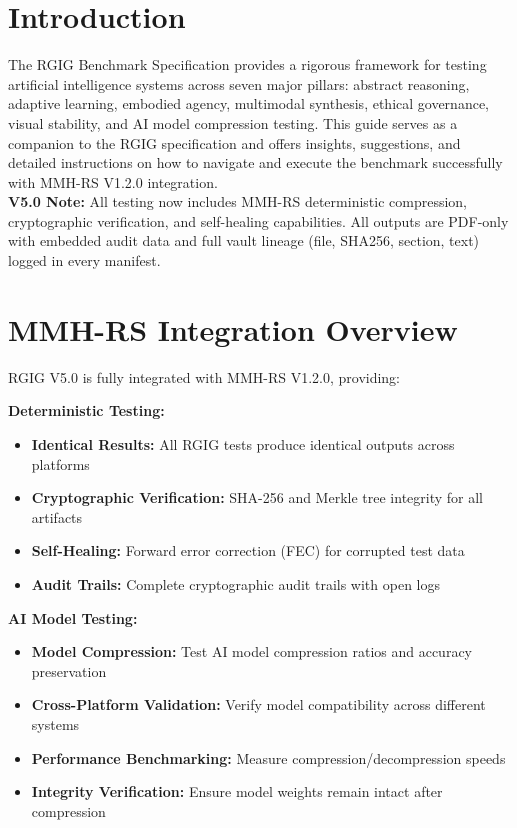 
\section*{Introduction}
The RGIG Benchmark Specification provides a rigorous framework for testing artificial intelligence systems across seven major pillars: abstract reasoning, adaptive learning, embodied agency, multimodal synthesis, ethical governance, visual stability, and AI model compression testing. This guide serves as a companion to the RGIG specification and offers insights, suggestions, and detailed instructions on how to navigate and execute the benchmark successfully with MMH-RS V1.2.0 integration.\\
\textbf{V5.0 Note:} All testing now includes MMH-RS deterministic compression, cryptographic verification, and self-healing capabilities. All outputs are PDF-only with embedded audit data and full vault lineage (file, SHA256, section, text) logged in every manifest.

\section*{MMH-RS Integration Overview}
RGIG V5.0 is fully integrated with MMH-RS V1.2.0, providing:

\textbf{Deterministic Testing:}
\begin{itemize}
  \item \textbf{Identical Results:} All RGIG tests produce identical outputs across platforms
  \item \textbf{Cryptographic Verification:} SHA-256 and Merkle tree integrity for all artifacts
  \item \textbf{Self-Healing:} Forward error correction (FEC) for corrupted test data
  \item \textbf{Audit Trails:} Complete cryptographic audit trails with open logs
\end{itemize}

\textbf{AI Model Testing:}
\begin{itemize}
  \item \textbf{Model Compression:} Test AI model compression ratios and accuracy preservation
  \item \textbf{Cross-Platform Validation:} Verify model compatibility across different systems
  \item \textbf{Performance Benchmarking:} Measure compression/decompression speeds
  \item \textbf{Integrity Verification:} Ensure model weights remain intact after compression
\end{itemize}

